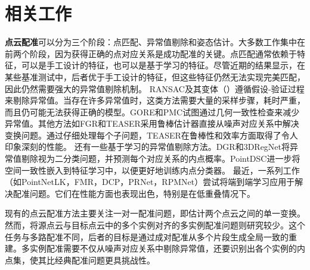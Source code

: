 %
%
%
%
%
%


\chapter{相关工作}

\textbf{点云配准}可以分为三个阶段：点匹配、异常值剔除和姿态估计。大多数工作集中在前两个阶段，因为获得正确的点对应关系是成功配准的关键。点匹配通常依赖于特征，可以是手工设计的特征\cite{rusu2009fast, drost2010model}，也可以是基于学习的特征\cite{3DMatch, PPFNet, 3DSmoothNet, FCGF, D3Feat}。尽管近期的结果显示，在某些基准测试中，后者优于手工设计的特征，但这些特征仍然无法实现完美匹配，因此仍然需要强大的异常值剔除机制。
RANSAC\cite{RANSAC}及其变体（\cite{GCRansac, NGRansac, LORansac}）遵循假设-验证过程来剔除异常值。当存在许多异常值时，这类方法需要大量的采样步骤，耗时严重，而且仍可能无法获得正确的模型。GORE\cite{bustos2017guaranteed}和PMC\cite{parra2019practical}试图通过几何一致性检查来减少异常值。其他方法如FGR\cite{FGR}和TEASER\cite{TEASER}采用鲁棒估计器直接从噪声对应关系中解决变换问题。通过仔细处理每个子问题，TEASER\cite{TEASER}在鲁棒性和效率方面取得了令人印象深刻的性能。
还有一些基于学习的异常值剔除方法。DGR\cite{DGR}和3DRegNet\cite{3DRegNet}将异常值剔除视为二分类问题，并预测每个对应关系的内点概率。PointDSC\cite{PointDSC}进一步将空间一致性嵌入到特征学习中，以便更好地训练内点分类器。
最近，一系列工作（如PointNetLK\cite{PointNetLK}，FMR\cite{FMR}，DCP\cite{DCP}，PRNet\cite{PRNet}，RPMNet\cite{RPMNet}）尝试将端到端学习应用于解决配准问题。它们在性能方面也表现出色，特别是在低重叠情况下\cite{PREDATOR}。

现有的点云配准方法主要关注一对一配准问题，即估计两个点云之间的单一变换。然而，将源点云与目标点云中的多个实例对齐的多实例配准问题则研究较少。这个任务与多路配准\cite{choi2015robust}不同，后者的目标是通过成对配准\cite{FGR}\cite{DGR}从多个片段生成全局一致的重建。多实例配准需要不仅从噪声对应关系中剔除异常值，还要识别出各个实例的内点集，使其比经典配准问题更具挑战性。

